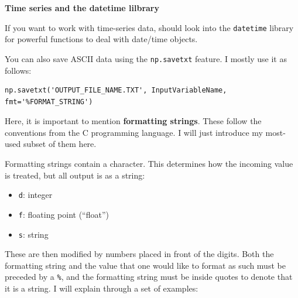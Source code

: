 \documentclass[a4paper,10pt]{scrartcl}
\begin{document}
\begin{framed}
\noindent\textbf{Time series and the datetime lilbrary}

If you want to work with time-series data, should look into the \lstinline{datetime} library for powerful functions to deal with date/time objects.
\end{framed}

You can also save ASCII data using the \lstinline{np.savetxt} feature. I mostly use it as follows:
\begin{lstlisting}
np.savetxt('OUTPUT_FILE_NAME.TXT', InputVariableName, fmt='%FORMAT_STRING')
\end{lstlisting}

Here, it is important to mention \textbf{formatting strings}. These follow the conventions from the C programming language. I will just introduce my most-used subset of them here.

Formatting strings contain a character. This determines how the incoming value is treated, but all output is as a string:
\begin{itemize}
 \item \lstinline{d}: integer
 \item \lstinline{f}: floating point (``float'')
 \item \lstinline{s}: string
\end{itemize}

These are then modified by numbers placed in front of the digits. Both the formatting string and the value that one would like to format as such must be preceded by a \lstinline{%}, and the formatting string must be inside quotes to denote that it is a string. I will explain through a set of examples:


\end{document}
